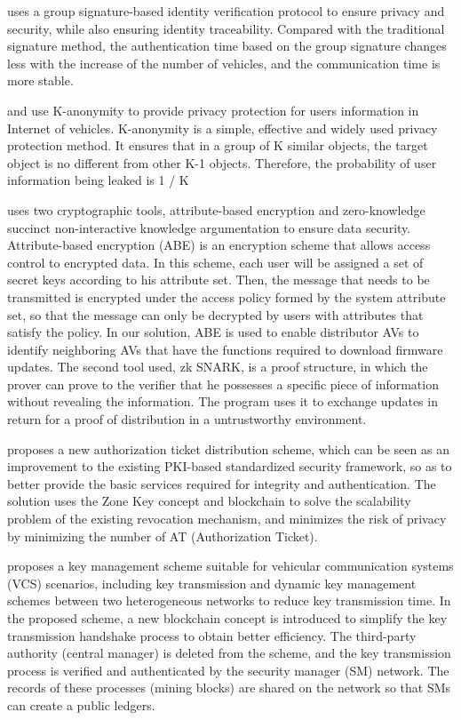 \cite{ref39} uses a group signature-based identity verification protocol to ensure privacy and security, while also ensuring identity traceability. Compared with the traditional signature method, the authentication time based on the group signature changes less with the increase of the number of vehicles, and the communication time is more stable.

\cite{ref11} and \cite{ref63} use K-anonymity to provide privacy protection for users information in Internet of vehicles. K-anonymity is a simple, effective and widely used privacy protection method. It ensures that in a group of K similar objects, the target object is no different from other K-1 objects. Therefore, the probability of user information being leaked is 1 / K

\cite{ref67} uses two cryptographic tools, attribute-based encryption and zero-knowledge succinct non-interactive knowledge argumentation to ensure data security. Attribute-based encryption (ABE) is an encryption scheme that allows access control to encrypted data. In this scheme, each user will be assigned a set of secret keys according to his attribute set. Then, the message that needs to be transmitted is encrypted under the access policy formed by the system attribute set, so that the message can only be decrypted by users with attributes that satisfy the policy. In our solution, ABE is used to enable distributor AVs to identify neighboring AVs that have the functions required to download firmware updates. The second tool used, zk SNARK, is a proof structure, in which the prover can prove to the verifier that he possesses a specific piece of information without revealing the information. The program uses it to exchange updates in return for a proof of distribution in a untrustworthy environment.

\cite{ref71} proposes a new authorization ticket distribution scheme, which can be seen as an improvement to the existing PKI-based standardized security framework, so as to better provide the basic services required for integrity and authentication. The solution uses the Zone Key concept and blockchain to solve the scalability problem of the existing revocation mechanism, and minimizes the risk of privacy by minimizing the number of AT (Authorization Ticket).

\cite{ref76} proposes a key management scheme suitable for vehicular communication systems (VCS) scenarios, including key transmission and dynamic key management schemes between two heterogeneous networks to reduce key transmission time. In the proposed scheme, a new blockchain concept is introduced to simplify the key transmission handshake process to obtain better efficiency. The third-party authority (central manager) is deleted from the scheme, and the key transmission process is verified and authenticated by the security manager (SM) network. The records of these processes (mining blocks) are shared on the network so that SMs can create a public ledgers.

